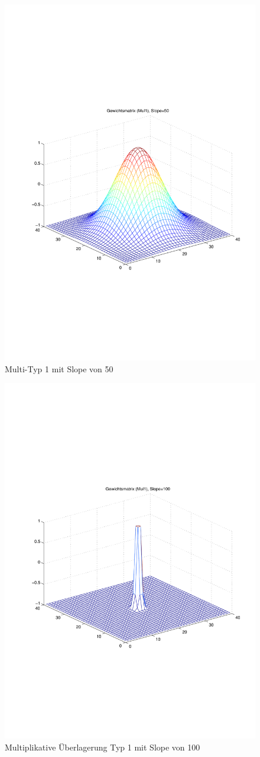 \begin{figure}[hbt]
\begin{minipage}{0.48\textwidth}
		\includegraphics[trim=70 200 32 242, clip, width=\textwidth]{./Bilder/Auswertung/Gewichtsmatrix/Gewichtsmatrix_Mul1_Slope_50}
		\caption{Multi-Typ 1 mit Slope von 50}
		\label{Mul150}
	\end{minipage}
\end{figure}
\begin{figure}[hbt]
	\centering
	\includegraphics[trim=70 200 32 242, clip, width=0.48\linewidth]{./Bilder/Auswertung/Gewichtsmatrix/Gewichtsmatrix_Mul1_Slope_100}
	\caption{Multiplikative Überlagerung Typ 1 mit Slope von 100}
	\label{Mul1100}
\end{figure}


